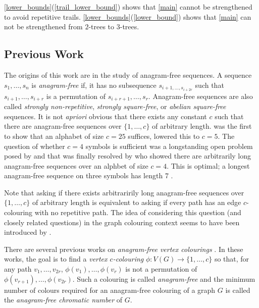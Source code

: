 \documentclass[kpfonts]{patmorin}
\begin{document}
\cref{lower_bounds}(\ref{trail_lower_bound}) shows that \cref{main} cannot be strengthened to avoid repetitive trails. \cref{lower_bounds}(\ref{lower_bound}) shows that \cref{main} can not be strengthened from $2$-trees to $3$-trees.

\subsection{Previous Work}
\label{previous_work}

The origins of this work are in the study of anagram-free sequences.  A sequence $s_1,\ldots,s_n$ is \emph{anagram-free} if, it has no subsequence $s_{i+1,\ldots,s_{i+2r}}$ such that $s_{i+1},\ldots,s_{i+r}$ is a permutation of $s_{i+r+1},\ldots,s_{r}$.  Anagram-free sequences are also called \emph{strongly non-repetitive}, \emph{strongly square-free}, or \emph{abelian square-free} sequences.  It is not \emph{apriori} obvious that there exists any constant $c$ such that there are anagram-free sequences over $\{1,\ldots,c\}$ of arbitrary length.  \cite{evdokimov:strongly,evdokimov:strongly2} was the first to show that an alphabet of size $c=25$ suffices, \cite{pleasants:non-repetitive} lowered this to $c=5$.  The question of whether $c=4$ symbols is sufficient was a longstanding open problem posed by \citet{erdos:some} and \citet{brown:is} that was finally resolved by \citet{keranen:abelian,keranen:powerful} who showed there are arbitrarily long anagram-free sequences over an alphbet of size $c=4$.  This is optimal; a longest anagram-free sequence on three symbols has length 7 \cite{cummings:strongly}.

Note that asking if there exists arbitraririly long anagram-free sequences over $\{1,\ldots,c\}$ of arbitrary length is equivalent to asking if every path has an edge $c$-colouring with no repetitive path.  The idea of considering this question (and closely related questions) in the graph colouring context seems to have been introduced by \citet{alon.grytczuk:nonrepetitive}.

There are several previous works on \emph{anagram-free vertex colourings} \cite{wilson.wood:anagram-free, kamcev.luczak.ea:anagram-free, carmi.dujmovic.ea:anagram-free, wilson.wood:anagram-free2}.  In these works, the goal is to find a \emph{vertex $c$-colouring} $\phi:V(G)\to\{1,\ldots,c\}$ so that, for any path $v_1,\ldots,v_{2r}$, $\phi(v_1),\ldots,\phi(v_r)$ is not a permutation of $\phi(v_{r+1}),\ldots,\phi(v_{2r})$. Such a colouring is called \emph{anagram-free} and the minimum number of colours required for an anagram-free colouring of a graph $G$ is called the \emph{anagram-free chromatic number} of $G$.  
\end{document}
